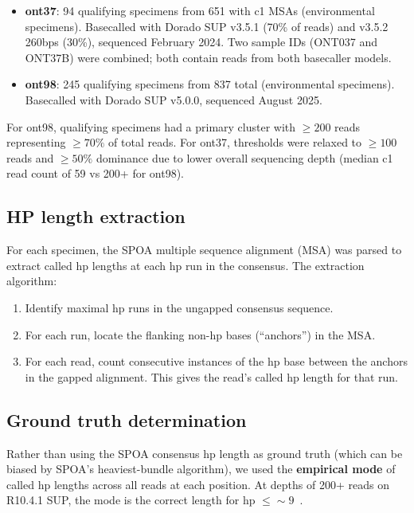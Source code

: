 \documentclass[11pt]{article}
\begin{document}
\begin{itemize}
\item \textbf{ont37}: 94 qualifying specimens from 651 with c1 MSAs
  (environmental specimens). Basecalled with Dorado SUP v3.5.1 (70\% of reads)
  and v3.5.2 260bps (30\%), sequenced February 2024. Two sample IDs (ONT037
  and ONT37B) were combined; both contain reads from both basecaller models.
\item \textbf{ont98}: 245 qualifying specimens from 837 total (environmental
  specimens). Basecalled with Dorado SUP v5.0.0, sequenced August 2025.
\end{itemize}

For ont98, qualifying specimens had a primary cluster with $\geq 200$ reads
representing $\geq 70\%$ of total reads. For ont37, thresholds were relaxed
to $\geq 100$ reads and $\geq 50\%$ dominance due to lower overall sequencing
depth (median c1 read count of 59 vs 200+ for ont98).

\subsection{HP length extraction}

For each specimen, the SPOA multiple sequence alignment (MSA) was parsed to
extract called hp lengths at each hp run in the consensus. The extraction
algorithm:

\begin{enumerate}
\item Identify maximal hp runs in the ungapped consensus sequence.
\item For each run, locate the flanking non-hp bases (``anchors'') in the MSA.
\item For each read, count consecutive instances of the hp base between the
  anchors in the gapped alignment. This gives the read's called hp length for
  that run.
\end{enumerate}

\subsection{Ground truth determination}

Rather than using the SPOA consensus hp length as ground truth (which can be
biased by SPOA's heaviest-bundle algorithm), we used the \textbf{empirical
mode} of called hp lengths across all reads at each position. At depths of
200+ reads on R10.4.1 SUP, the mode is the correct length for hp $\leq
{\sim}9$~\cite{sereika2022}.
\end{document}
